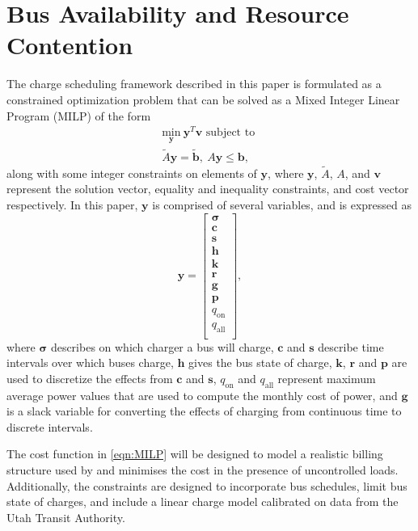 \section{Bus Availability and Resource Contention\label{sec:4_formulation}}
The charge scheduling framework described in this paper is formulated as a constrained optimization problem that can be solved as a Mixed Integer Linear Program (MILP) of the form
\begin{equation}\label{eqn:MILP}\begin{matrix}
	\underset{\mathbf{y}}{\text{min}} \ \mathbf{y}^T\mathbf{v} \text{ subject to } \\
	\tilde{A}\mathbf{y} = \tilde{\mathbf{b}}, \ A\mathbf{y} \le \mathbf{b},
\end{matrix} \end{equation}
along with some integer constraints on elements of $\mathbf{y}$,
where $\mathbf{y}$, $\tilde{A}$, $A$, and $\mathbf{v}$ represent the solution vector, equality and inequality constraints, and cost vector respectively. In this paper, $\mathbf{y}$ is comprised of several variables, and is expressed as 
\begin{equation}\label{eqn:yDef}
	\mathbf{y} = \begin{bmatrix}
			\boldsymbol{\sigma} \\ 
			\mathbf{c}      \\ 
			\mathbf{s}      \\ 
			\mathbf{h}      \\ 
			\mathbf{k}      \\ 
			\mathbf{r}      \\ 
			\mathbf{g}      \\
			\mathbf{p}      \\ 
			q_{\text{on}}   \\ 
			q_{\text{all}}  \\
		     \end{bmatrix},
\end{equation}
where $\boldsymbol{\sigma}$ describes on which charger a bus will charge, $\mathbf{c}$ and $\mathbf{s}$ describe time intervals over which buses charge, $\mathbf{h}$ gives the bus state of charge, $\mathbf{k}$, $\mathbf{r}$ and $\mathbf{p}$ are used to discretize the effects from $\mathbf{c}$ and $\mathbf{s}$, $q_{\text{on}}$ and $q_{\text{all}}$ represent maximum average power values that are used to compute the monthly cost of power, and $\mathbf{g}$ is a slack variable for converting the effects of charging from continuous time to discrete intervals. 
\par The cost function in \eqref{eqn:MILP} will be designed to model a realistic billing structure used by \cite{rocky_mountain_power_rocky_2021} and minimises the cost in the presence of uncontrolled loads. Additionally, the constraints are designed to incorporate bus schedules, limit bus state of charges, and include a linear charge model calibrated on data from the Utah Transit Authority.
